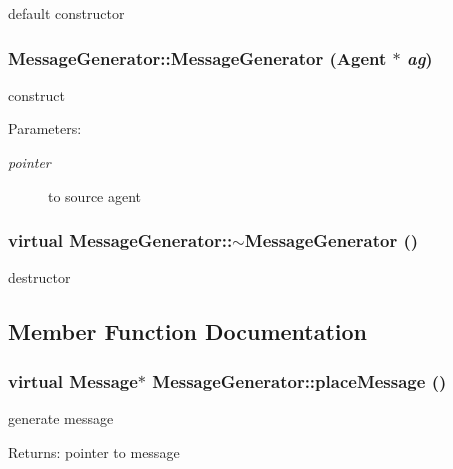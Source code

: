 default constructor 

\subsubsection[MessageGenerator]{\setlength{\rightskip}{0pt plus 5cm}MessageGenerator::MessageGenerator ({\bf Agent} $\ast$ {\em ag})}\label{classMessageGenerator_0878332ef68ecf3c13a2ba19cd3d89ef}


construct \begin{Desc}
\item[Parameters:]
\begin{description}
\item[{\em pointer}]to source agent \end{description}
\end{Desc}
\subsubsection[$\sim$MessageGenerator]{\setlength{\rightskip}{0pt plus 5cm}virtual MessageGenerator::$\sim$MessageGenerator ()\hspace{0.3cm}{\tt  [pure virtual]}}\label{classMessageGenerator_8a20c88d0cf01bc6d3b2f54734b39a14}


destructor 



\subsection{Member Function Documentation}
\subsubsection[placeMessage]{\setlength{\rightskip}{0pt plus 5cm}virtual {\bf Message}$\ast$ MessageGenerator::placeMessage ()\hspace{0.3cm}{\tt  [pure virtual]}}\label{classMessageGenerator_6da422ed53d26661c646043e2c326a4b}


generate message \begin{Desc}
\item[Returns:]pointer to message \end{Desc}


